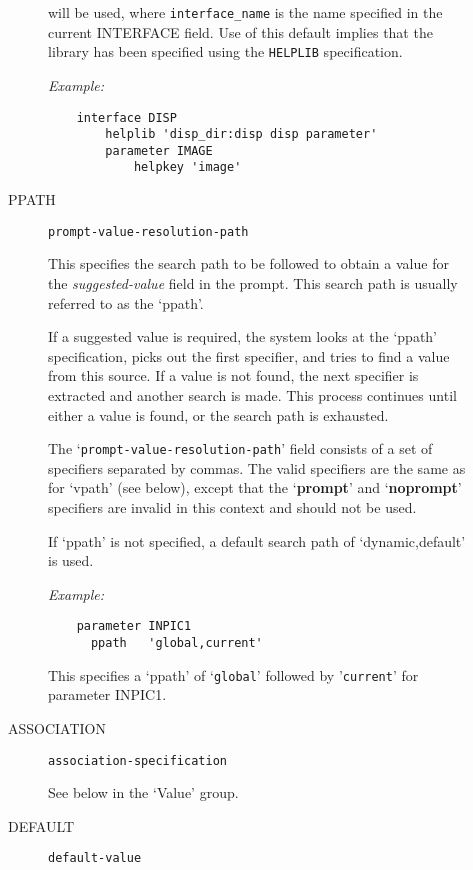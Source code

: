 \begin{description}
\begin{description}
will be used, where \verb+interface_name+ is the name specified in the current
INTERFACE field.
Use of this default implies that the library has been specified using
the \verb+HELPLIB+ specification.

{\em Example:}

\begin{small}
\begin{verbatim}
    interface DISP
        helplib 'disp_dir:disp disp parameter'
        parameter IMAGE
            helpkey 'image'
\end{verbatim}
\end{small}


\item [PPATH] {\tt prompt-value-resolution-path}

This specifies the search path to be followed to obtain a value for the
{\em suggested-value} field in the prompt.
This search path is usually referred to as the `ppath'.

If a suggested value is required, the system looks at the `ppath' specification,
picks out the first specifier, and tries to find a value from this source.
If a value is not found, the next specifier is extracted and another search is
made.
This process continues until either a value is found, or the search path is
exhausted.

The `\verb+prompt-value-resolution-path+' field consists of a set of specifiers
separated by commas.
The valid specifiers are the same as for `vpath' (see below), except that the
`{\bf prompt}' and `{\bf noprompt}' specifiers are invalid in this context and
should not be used.

If `ppath' is not specified, a default search path of `dynamic,default' is
used.

{\em Example:}

\begin{small}
\begin{verbatim}
    parameter INPIC1
      ppath   'global,current'
\end{verbatim}
\end{small}

This specifies a `ppath' of `\verb+global+' followed by '\verb+current+'
for parameter INPIC1.

\item [ASSOCIATION] {\tt association-specification}

See below in the `Value' group.

\item [DEFAULT] {\tt default-value}


\end{description}
\end{description}
